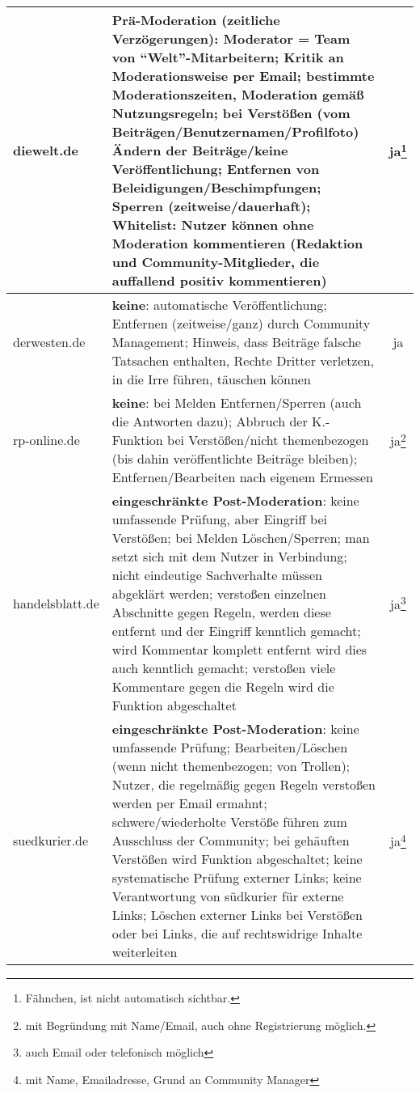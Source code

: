 \begin{landscape}
\begin{longtable}{lp{132mm}c}
diewelt.de
& {\bfseries Prä-Moderation} (zeitliche Verzögerungen): Moderator = Team von
  ``Welt''-Mitarbeitern; Kritik an Moderationsweise per Email; bestimmte
  Moderationszeiten, Moderation gemäß Nutzungsregeln; bei Verstößen (vom
  Beiträgen/Benutzernamen/Profilfoto) Ändern der Beiträge/keine
  Veröffentlichung; Entfernen von Beleidigungen/Beschimpfungen; Sperren
  (zeitweise/dauerhaft); Whitelist: Nutzer können ohne Moderation kommentieren
  (Redaktion und Community-Mitglieder, die auffallend positiv kommentieren)
& ja\footnote{Fähnchen, ist nicht automatisch sichtbar.}
\\\midrule

derwesten.de
& {\bfseries keine}: automatische Veröffentlichung; Entfernen (zeitweise/ganz)
  durch Community Management; Hinweis, dass Beiträge falsche Tatsachen
  enthalten, Rechte Dritter verletzen, in die Irre führen, täuschen können
& ja
\\\midrule

rp-online.de
& {\bfseries keine}: bei Melden Entfernen/Sperren (auch die Antworten dazu);
  Abbruch der K.-Funktion bei Verstößen/nicht themenbezogen (bis dahin
  veröffentlichte Beiträge bleiben); Entfernen/Bearbeiten nach eigenem Ermessen
& ja\footnote{mit Begründung mit Name/Email, auch ohne Registrierung möglich.}
\\\midrule

handelsblatt.de
& {\bfseries eingeschränkte Post-Moderation}: keine umfassende Prüfung, aber
  Eingriff bei Verstößen;  bei Melden Löschen/Sperren; man setzt sich mit dem
  Nutzer in Verbindung; nicht eindeutige Sachverhalte müssen abgeklärt werden;
  verstoßen einzelnen Abschnitte gegen Regeln, werden diese entfernt und der
  Eingriff kenntlich gemacht; wird Kommentar komplett entfernt wird dies auch
  kenntlich gemacht; verstoßen viele Kommentare gegen die Regeln wird die
  Funktion abgeschaltet
& ja\footnote{auch Email oder telefonisch möglich}
\\\midrule

suedkurier.de
& {\bfseries eingeschränkte Post-Moderation}: keine umfassende Prüfung;
  Bearbeiten/Löschen (wenn nicht themenbezogen; von Trollen); Nutzer, die
  regelmäßig gegen Regeln verstoßen werden per Email ermahnt;
  schwere/wiederholte Verstöße führen zum Ausschluss der Community; bei
  gehäuften Verstößen wird Funktion abgeschaltet; keine systematische Prüfung
  externer Links; keine Verantwortung von südkurier für externe Links; Löschen
  externer Links bei Verstößen oder bei Links, die auf rechtswidrige Inhalte
  weiterleiten
& ja\footnote{mit Name, Emailadresse, Grund an Community Manager}
\\\midrule


\end{longtable}
\end{landscape}
